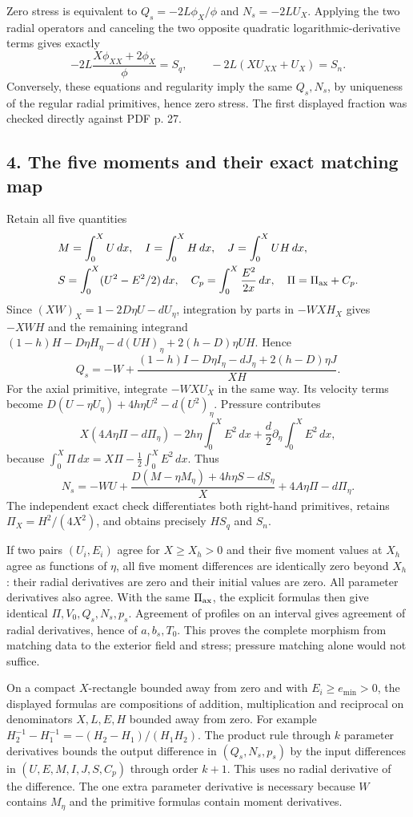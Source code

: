 \documentclass[10pt,a4paper]{article}
\begin{document}
Zero stress is equivalent to
\(Q_s=-2L\phi_X/\phi\) and \(N_s=-2LU_X\). Applying the two radial operators and canceling the two opposite quadratic logarithmic-derivative terms gives exactly
\[
-2L\frac{X\phi_{XX}+2\phi_X}{\phi}=S_q,
\qquad -2L(XU_{XX}+U_X)=S_n.
\]
Conversely, these equations and regularity imply the same \(Q_s,N_s\), by uniqueness of the regular radial primitives, hence zero stress. The first displayed fraction was checked directly against PDF p. 27.

\subsection{4. The five moments and their exact matching map}

Retain all five quantities
\[
\begin{aligned}
&M=\int_0^XU\,dx,\quad I=\int_0^XH\,dx,\quad J=\int_0^XUH\,dx,\\
&S=\int_0^X(U^2-E^2/2)\,dx,\quad C_p=\int_0^X\frac{E^2}{2x}\,dx,\quad \Pi=\Pi_{\rm ax}+C_p.
\end{aligned}
\]
Since \((XW)_X=1-2D\eta U-dU_\eta\), integration by parts in \(-WXH_X\) gives \(-XWH\) and the remaining integrand
\((1-h)H-D\eta H_\eta-d(UH)_\eta+2(h-D)\eta UH\). Hence
\[
Q_s=-W+\frac{(1-h)I-D\eta I_\eta-dJ_\eta+2(h-D)\eta J}{XH}.
\]
For the axial primitive, integrate \(-WXU_X\) in the same way. Its velocity terms become
\(D(U-\eta U_\eta)+4h\eta U^2-d(U^2)_\eta\). Pressure contributes
\[
X(4A\eta\Pi-d\Pi_\eta)-2h\eta\int_0^XE^2\,dx
+\frac d2\partial_\eta\int_0^XE^2\,dx,
\]
because \(\int_0^X\Pi\,dx=X\Pi-\frac12\int_0^XE^2\,dx\). Thus
\[
N_s=-WU+\frac{D(M-\eta M_\eta)+4h\eta S-dS_\eta}{X}
+4A\eta\Pi-d\Pi_\eta.
\]
The independent exact check differentiates both right-hand primitives, retains \(\Pi_X=H^2/(4X^2)\), and obtains precisely \(HS_q\) and \(S_n\).

If two pairs \((U_i,E_i)\) agree for \(X\ge X_h>0\) and their five moment values at \(X_h\) agree as functions of \(\eta\), all five moment differences are identically zero beyond \(X_h\): their radial derivatives are zero and their initial values are zero. All parameter derivatives also agree. With the same \(\Pi_{\rm ax}\), the explicit formulas then give identical \(\Pi,V_0,Q_s,N_s,p_s\). Agreement of profiles on an interval gives agreement of radial derivatives, hence of \(a,b_s,T_0\). This proves the complete morphism from matching data to the exterior field and stress; pressure matching alone would not suffice.

On a compact \(X\)-rectangle bounded away from zero and with \(E_i\ge e_{\min}>0\), the displayed formulas are compositions of addition, multiplication and reciprocal on denominators \(X,L,E,H\) bounded away from zero. For example
\(H_2^{-1}-H_1^{-1}=-(H_2-H_1)/(H_1H_2)\). The product rule through \(k\) parameter derivatives bounds the output difference in \((Q_s,N_s,p_s)\) by the input differences in \((U,E,M,I,J,S,C_p)\) through order \(k+1\). This uses no radial derivative of the difference. The one extra parameter derivative is necessary because \(W\) contains \(M_\eta\) and the primitive formulas contain moment derivatives.
\end{document}
